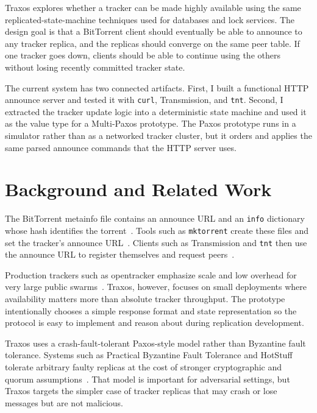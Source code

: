 \documentclass[letterpaper,twocolumn,10pt]{article}
\begin{document}
Traxos explores whether a tracker can be made highly available using the
same replicated-state-machine techniques used for databases and lock
services. The design goal is that a BitTorrent client should eventually be
able to announce to any tracker replica, and the replicas should converge
on the same peer table. If one tracker goes down, clients should be able to
continue using the others without losing recently committed tracker state.

The current system has two connected artifacts. First, I built a functional
HTTP announce server and tested it with \texttt{curl}, Transmission, and
\texttt{tnt}. Second, I extracted the tracker update logic into a
deterministic state machine and used it as the value type for a Multi-Paxos
prototype. The Paxos prototype runs in a simulator rather than as a
networked tracker cluster, but it orders and applies the same parsed
announce commands that the HTTP server uses.

\section{Background and Related Work}

The BitTorrent metainfo file contains an announce URL and an \texttt{info}
dictionary whose hash identifies the torrent~\cite{bittorrentSpec}. Tools
such as \texttt{mktorrent} create these files and set the tracker's announce
URL~\cite{mktorrent}. Clients such as Transmission and \texttt{tnt} then use
the announce URL to register themselves and request peers~\cite{transmission,tnt}.

Production trackers such as opentracker emphasize scale and low overhead for
very large public swarms~\cite{opentracker}. Traxos, however, focuses on small
deployments where availability matters more than absolute tracker throughput.
The prototype intentionally chooses a simple response format and state
representation so the protocol is easy to implement and reason about during
replication development.

Traxos uses a crash-fault-tolerant Paxos-style model rather than Byzantine
fault tolerance. Systems such as Practical Byzantine Fault Tolerance and
HotStuff tolerate arbitrary faulty replicas at the cost of stronger
cryptographic and quorum assumptions~\cite{pbft,hotstuff}. That model is
important for adversarial settings, but Traxos targets the simpler case of
tracker replicas that may crash or lose messages but are not malicious.
\end{document}
